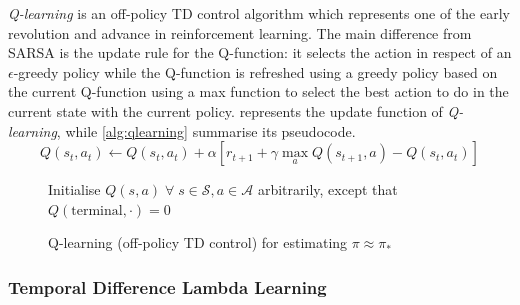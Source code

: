 \textit{Q-learning} \cite{watkins1989learning} is an off-policy TD control algorithm which represents one of the early revolution and advance in reinforcement learning.
The main difference from SARSA is the update rule for the Q-function: it selects the action in respect of an $\epsilon$-greedy policy while the Q-function is refreshed using a greedy policy based on the current Q-function using a max function to select the best action to do in the current state with the current policy.
 represents the update function of \textit{Q-learning}, while \vref{alg:qlearning} summarise its pseudocode.
\begin{equation}\label{eq:qlearning}
Q(s_t, a_t) \leftarrow Q(s_t, a_t) + \alpha [r_{t+1} + \gamma \max_{a}{Q(s_{t+1}, a)} - Q(s_t, a_t)]
\end{equation}
\begin{figure}
	
	\begin{algorithm}[H]
		\SetAlgoLined
		\DontPrintSemicolon
		\LinesNumbered
		\KwIn{step size $\alpha \in (0,1]$, small $\epsilon > 0$\;}
		Initialise $Q(s,a) \; \forall\; s \in \mathcal{S}, a \in \mathcal{A}$ arbitrarily, except that $Q(\text{terminal}, \cdot) = 0$\;
		\caption{Q-learning (off-policy TD control) for estimating $\pi \approx \pi_*$}
		\label{alg:qlearning}
	\end{algorithm}
\end{figure}

\subsubsection{Temporal Difference Lambda Learning}

